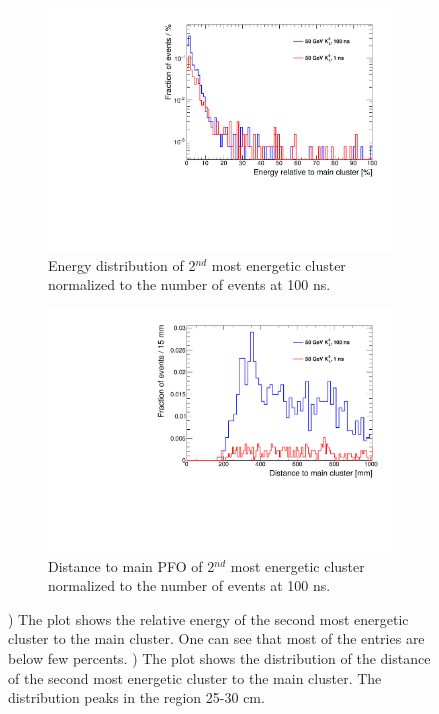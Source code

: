 \begin{figure}[htbp!]
  \centering
  \begin{subfigure}[t]{0.49\textwidth}
    \centering
    \includegraphics[width=1\linewidth]{../Thesis_Plots/ILD/AdditionalPlots/Plots/Energy2ndCluster_100ns_50GeV}
    \caption{Energy distribution of 2$^{nd}$ most energetic cluster normalized to the number of events at 100 ns.} \label{fig:Energy2ndCluster}
  \end{subfigure}
  \hfill
  \begin{subfigure}[t]{0.49\textwidth}
    \centering
    \includegraphics[width=1\linewidth]{../Thesis_Plots/ILD/AdditionalPlots/Plots/Distance2ndCluster_100ns_50GeV}
    \caption{Distance to main PFO of 2$^{nd}$ most energetic cluster normalized to the number of events at 100 ns.} \label{fig:Distance2ndCluster}
  \end{subfigure}
  \caption{) The plot shows the relative energy of the second most energetic cluster to the main cluster. One can see that most of the entries are below few percents. ) The plot shows the distribution of the distance of the second most energetic cluster to the main cluster. The distribution peaks in the region 25-30 cm.}
\end{figure}

